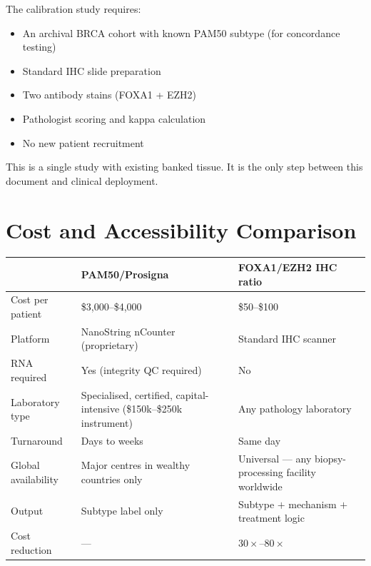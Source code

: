 \documentclass[12pt, a4paper]{article}
\begin{document}
The calibration study requires:
\begin{itemize}
    \item An archival BRCA cohort with known
    PAM50 subtype (for concordance testing)
    \item Standard IHC slide preparation
    \item Two antibody stains (FOXA1 + EZH2)
    \item Pathologist scoring and kappa
    calculation
    \item No new patient recruitment
\end{itemize}

This is a single study with existing banked
tissue. It is the only step between this
document and clinical deployment.

\section{Cost and Accessibility Comparison}

\begin{center}
\begin{tabular}{p{3.5cm}p{4cm}p{4cm}}
\toprule
& \textbf{PAM50/Prosigna} &
\textbf{FOXA1/EZH2 IHC ratio} \\
\midrule
Cost per patient &
\$3,000--\$4,000 &
\$50--\$100 \\[0.3em]
Platform &
NanoString nCounter (proprietary) &
Standard IHC scanner \\[0.3em]
RNA required &
Yes (integrity QC required) &
No \\[0.3em]
Laboratory type &
Specialised, certified,
capital-intensive (\$150k--\$250k
instrument) &
Any pathology laboratory \\[0.3em]
Turnaround &
Days to weeks &
Same day \\[0.3em]
Global availability &
Major centres in wealthy countries
only &
Universal --- any biopsy-processing
facility worldwide \\[0.3em]
Output &
Subtype label only &
Subtype $+$ mechanism $+$
treatment logic \\[0.3em]
Cost reduction &
--- &
$30\times$--$80\times$ \\
\bottomrule
\end{tabular}
\end{center}

\end{document}
